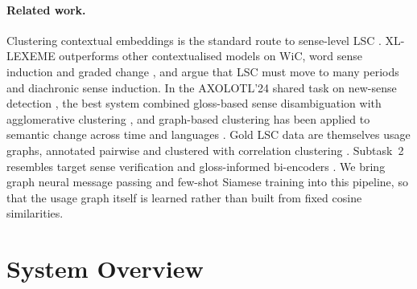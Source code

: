 \documentclass[11pt]{article}
\newcommand{\xll}{XL-LEXEME\xspace}
\begin{document}
\paragraph{Related work.}
Clustering contextual embeddings is the standard route to sense-level LSC \citep{giulianelli2020analysing,martinc2020capturing,periti2024lexical}. \xll outperforms other contextualised models on WiC, word sense induction and graded change \citep{periti2024systematic}, and \citet{periti2024towards} argue that LSC must move to many periods and diachronic sense induction. In the AXOLOTL'24 shared task on new-sense detection \citep{fedorova2024axolotl}, the best system combined gloss-based sense disambiguation with agglomerative clustering \citep{kokosinskii2024deepchange}, and graph-based clustering has been applied to semantic change across time and languages \citep{ma2024graphbased}. Gold LSC data are themselves usage graphs, annotated pairwise and clustered with correlation clustering \citep{schlechtweg2021dwug,schlechtweg2024sense}. Subtask~2 resembles target sense verification \citep{breit2021wictsv} and gloss-informed bi-encoders \citep{blevins2020moving}. We bring graph neural message passing and few-shot Siamese training into this pipeline, so that the usage graph itself is learned rather than built from fixed cosine similarities.

\section{System Overview}
\end{document}
